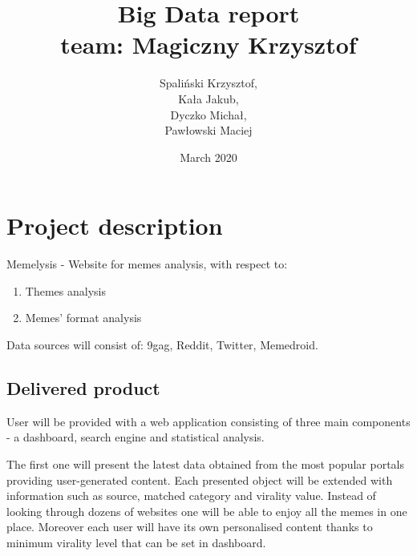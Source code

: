 \documentclass{article}
\title{\textbf{Big Data report} \\ \vspace{2em} team: Magiczny Krzysztof \\ \vspace{2em}}
\author{Spaliński Krzysztof, \\ Kała Jakub, \\ Dyczko Michał, \\ Pawłowski Maciej}
\date{\vfill March 2020}
\begin{document}
\clearpage\maketitle
\thispagestyle{empty}

\newpage

\section{Project description}



Memelysis - Website for memes analysis, with respect to:
\begin{enumerate}
    \item Themes analysis
    \item Memes' format analysis
\end{enumerate}

Data sources will consist of: 9gag, Reddit, Twitter, Memedroid.


\subsection{Delivered product}

User will be provided with a web application consisting of three main components - a dashboard, search engine and statistical analysis. 

The first one will present the latest data obtained from the most popular portals providing user-generated content. Each presented object will be extended with information such as source, matched category and virality value. Instead of looking through dozens of websites one will be able to enjoy all the memes in one place. Moreover each user will have its own personalised content thanks to minimum virality level that can be set in dashboard. %
\end{document}
